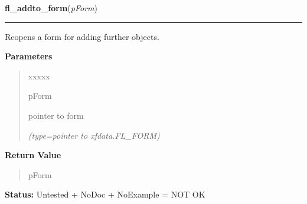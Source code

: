 \hspace{.8\funcindent}\begin{boxedminipage}{\funcwidth}

    \raggedright \textbf{fl\_addto\_form}(\textit{pForm})

    \vspace{-1.5ex}

    \rule{\textwidth}{0.5\fboxrule}
\setlength{\parskip}{2ex}
    Reopens a form for adding further objects.

\setlength{\parskip}{1ex}
      \textbf{Parameters}
      \vspace{-1ex}

      \begin{quote}
        \begin{Ventry}{xxxxx}

          \item[pForm]

          pointer to form

            {\it (type=pointer to xfdata.FL\_FORM)}

        \end{Ventry}

      \end{quote}

      \textbf{Return Value}
    \vspace{-1ex}

      \begin{quote}
      pForm

      \end{quote}

\textbf{Status:} Untested + NoDoc + NoExample = NOT OK



    \end{boxedminipage}

    \label{xformslib:library:fl_make_object}

    \vspace{0.5ex}

